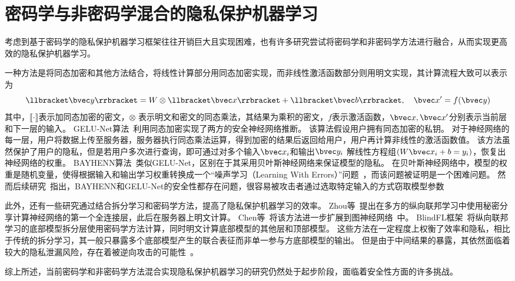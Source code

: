 \section{密码学与非密码学混合的隐私保护机器学习}
考虑到基于密码学的隐私保护机器学习框架往往开销巨大且实现困难，也有许多研究尝试将密码学和非密码学方法进行融合，从而实现更高效的隐私保护机器学习。
%

一种方法是将同态加密和其他方法结合，将线性计算部分用同态加密实现，而非线性激活函数部分则用明文实现，其计算流程大致可以表示为
\begin{equation}
    \llbracket \bvec y \rrbracket = W \otimes \llbracket \bvec x \rrbracket  + \llbracket \bvec b \rrbracket, \quad \bvec x' = f(\bvec y)
\end{equation}
其中，$\llbracket \cdot \rrbracket$表示加同态加密的密文，$\otimes$ 表示明文和密文的同态乘法，其结果为乘积的密文，$f$表示激活函数，$\bvec x, \bvec x'$分别表示当前层和下一层的输入。
%
GELU-Net算法~\cite{zhangqiao_2018_gelu_net}利用同态加密实现了两方的安全神经网络推断。
该算法假设用户拥有同态加密的私钥。
对于神经网络的每一层，用户将数据上传至服务器，服务器执行同态乘法运算，得到加密的结果后返回给用户，用户再计算非线性的激活函数值。
%
该方法虽然保护了用户的隐私，但是若用户多次进行查询，即可通过对多个输入$\bvec x_i$和输出$\bvec y_i$ 解线性方程组$(W\bvec x_i + b = y_i)$，恢复出神经网络的权重。
%
BAYHENN算法~\cite{xiepeichen_2019_bayhenn}类似GELU-Net，区别在于其采用贝叶斯神经网络来保证模型的隐私。
在贝叶斯神经网络中，模型的权重是随机变量，使得根据输入和输出学习权重转换成一个“噪声学习（Learning With Errors）”问题~\cite{regev_2010_lwe}，而该问题被证明是一个困难问题。
%
然而后续研究~\cite{wong_2020_lwe_model}指出，BAYHENN和GELU-Net的安全性都存在问题，很容易被攻击者通过选取特定输入的方式窃取模型参数

此外，还有一些研究通过结合拆分学习和密码学方法，提高了隐私保护机器学习的效率。
Zhou等~\cite{zhou_2022_codesign}提出在多方的纵向联邦学习中使用秘密分享计算神经网络的第一个全连接层，此后在服务器上明文计算。
Chen等~\cite{chen2020vertically}将该方法进一步扩展到图神经网络~\cite{defferrard_2016_gcn,hamilton_2017_graphsage,wuzonghan_2020_gnn_survey}中。
%
BlindFL框架~\cite{fu2022blindfl}将纵向联邦学习的底部模型拆分层使用密码学方法计算，同时明文计算底部模型的其他层和顶部模型。
%
这些方法在一定程度上权衡了效率和隐私，相比于传统的拆分学习，其一般只暴露多个底部模型产生的联合表征而非单一参与方底部模型的输出。
%
但是由于中间结果的暴露，其依然面临着较大的隐私泄漏风险，存在着被逆向攻击的可能性~\cite{hezecheng_2019_model_inversion_attack,abuadbba2020can_split,luoxinjian2021feature_attack,erdogan2022unsplit,qiupengyu_2023_label_selling_you_out}。

综上所述，当前密码学和非密码学方法混合实现隐私保护机器学习的研究仍然处于起步阶段，面临着安全性方面的许多挑战。
%
